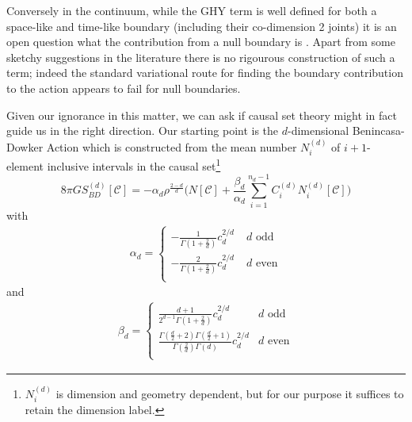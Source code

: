 \documentclass[12pt]{article}
\begin{document}
Conversely in the continuum, while the GHY term  is well defined for both a space-like and time-like boundary  (including their co-dimension 2 joints)  it is an open question what the contribution from a null  boundary  is \cite{Gibbons_Hawking_Boundary, Harris}. Apart from some sketchy suggestions in the literature \cite{neiman} there is no rigourous construction of such a term; indeed the standard variational route for finding the boundary contribution to the action appears to fail for null boundaries. 

Given our ignorance in this matter,  we can ask if causal set theory  might  in fact guide us in the right direction.   Our starting point is the $d$-dimensional  Benincasa-Dowker Action \cite{Benincasa_Dowker:The_Scalar_Curvature_of_a_Causal_Set, Dowker_Glaser:dAlembertians_for_Causal_Sets} which is constructed from the mean number  $N_i^{ (d)}$ of $i+1$-element inclusive intervals in the causal set\footnote{ $N_i^{ (d)}$ is dimension  and geometry dependent, but for our purpose it suffices to retain the dimension label. }
\begin{equation}   
8 \pi G {S_{BD}^{ (d)}}\left[\mathcal C\right] = -\alpha_d \rho^{\frac{2-d}{d}}\biggl ( N[\mathcal C]+ \frac{\beta_d}{ \alpha_d} \sum_{i=1}^{n_d-1}  C^{ (d)}_{i} N _i^{ (d)}[\mathcal C] \biggr) 
\label{bd} 
\end{equation}  
with   
\begin{equation}
\begin{aligned}
 \alpha_d =   
\begin{cases}
\displaystyle
-\frac1{\Gamma\left (1+\frac2d\right)}c_d ^{2/d} \;   &d \, \, \mathrm{odd} \\
\displaystyle
- \frac{2}{\Gamma\left (1+\frac2d\right)}c_d ^{2/d}  \;   &d \, \,  \mathrm{even} \\
\end{cases}
\end{aligned}
\end{equation}
and
\begin{equation}
\begin{aligned}
\beta_d =
\begin{cases}\displaystyle
\frac{d+1}{2^{d-1}\Gamma\left (1+\frac2d\right)} c_d^{2/d}   \;   &d\mathrm{ \, \, odd}\\ 
\displaystyle
\frac{\Gamma\left (\frac{d}{2}+2\right)\Gamma\left (\frac{d}{2}+1\right)}{\Gamma\left (\frac{2}{d}\right)\Gamma\left (d\right)}c_d^{2/d}  &  d\mathrm{ \, \,  even}\\ 
\end{cases} 
\end{aligned}
\end{equation}
\end{document}
